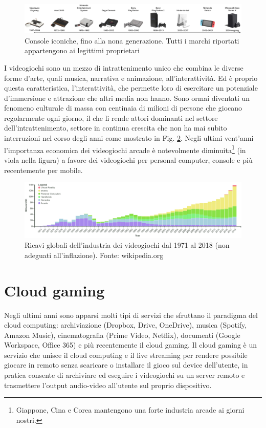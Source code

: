 \begin{figure}[H]
	\includegraphics[width=\linewidth]{immagini/consoles_history}
	\caption{Console iconiche, fino alla nona generazione. Tutti i marchi riportati appartengono ai legittimi proprietari}
	\label{fig:consoles_history}
\end{figure}

I videogiochi sono un mezzo di intrattenimento unico che combina le diverse forme d'arte, quali musica, narrativa e animazione, all'interattività. Ed è proprio questa caratteristica, l'interattività, che permette loro di esercitare un potenziale d'immersione e attrazione che altri media non hanno. Sono ormai diventati un fenomeno culturale di massa con centinaia di milioni di persone che giocano regolarmente ogni giorno, il che li rende attori dominanti nel settore dell'intrattenimento, settore in continua crescita che non ha mai subito interruzioni nel corso degli anni come mostrato in Fig. \ref{fig:valore_commerciale_giochi_globale}. Negli ultimi vent'anni l'importanza economica dei videogiochi arcade è notevolmente diminuita\footnote{Giappone, Cina e Corea mantengono una forte industria arcade ai giorni nostri.} (in viola nella figura) a favore dei videogiochi per personal computer, console e più recentemente per mobile.

\begin{figure}[H]
	\includegraphics[width=\linewidth]{immagini/valore_commerciale_giochi_globale.png}
	\caption{Ricavi globali dell'industria dei videogiochi dal 1971 al 2018 (non adeguati all'inflazione). Fonte: wikipedia.org}
	\label{fig:valore_commerciale_giochi_globale}
\end{figure}



\section{Cloud gaming}
Negli ultimi anni sono apparsi molti tipi di servizi che sfruttano il paradigma del cloud computing: archiviazione (Dropbox, Drive, OneDrive), musica (Spotify, Amazon Music), cinematografia (Prime Video, Netflix), documenti (Google Workspace, Office 365) e più recentemente il cloud gaming. Il cloud gaming è un servizio che unisce il cloud computing e il live streaming per rendere possibile giocare in remoto senza scaricare o installare il gioco sul device dell'utente, in pratica consente di archiviare ed eseguire i videogiochi su un server remoto e trasmettere l'output audio-video all'utente sul proprio dispositivo.

